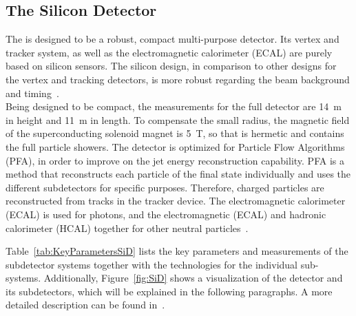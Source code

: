 \subsection{The Silicon Detector}
\label{ILC:SiD}
The \sid is designed to be a robust, compact multi-purpose detector.
Its vertex and tracker system, as well as the electromagnetic calorimeter (ECAL) are purely based on silicon sensors.
The silicon design, in comparison to other designs for the vertex and tracking detectors, is more robust regarding the beam background and timing~\cite[cf. p. 57ff]{TDR4}.
\\Being designed to be compact, the measurements for the full detector are \SI{14}{\meter} in height and \SI{11}{\meter} in length.
To compensate the small radius, the magnetic field of the superconducting solenoid magnet is \SI{5}{\tesla}, so that \sid is hermetic and contains the full particle showers.
The detector is optimized for Particle Flow Algorithms (PFA), in order to improve on the jet energy reconstruction capability.
PFA is a method that reconstructs each particle of the final state individually and uses the different subdetectors for specific purposes. 
Therefore, charged particles are reconstructed from tracks in the tracker device.
The electromagnetic calorimeter (ECAL) is used for photons, and the electromagnetic (ECAL) and hadronic calorimeter (HCAL) together for other neutral particles~\cite{PFA}.

Table~\ref{tab:KeyParametersSiD} lists the key parameters and measurements of the \sid subdetector systems together with the technologies for the individual sub-systems.
Additionally, Figure~\ref{fig:SiD} shows a visualization of the \sid detector and its subdetectors, which will be explained in the following paragraphs.
A more detailed description can be found in~\cite{TDR4}.


